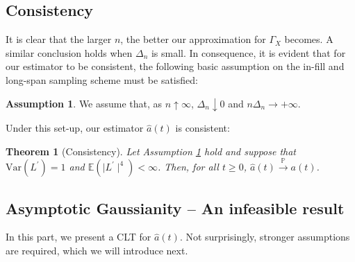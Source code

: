 \documentclass{article}
\theoremstyle{plain}
\newtheorem{theorem}{Theorem}
\theoremstyle{definition}
\newtheorem{assumption}{Assumption}
\theoremstyle{remark}
\newcommand{\Var}{\ensuremath{\mathrm{Var}}}
\begin{document}
\subsection{Consistency}
It is clear that the larger $n$, the better our approximation for $\varGamma_{X}$ becomes. A similar conclusion holds when $\Delta_{n}$ is small. In consequence, it is evident that for our estimator to be consistent, the following basic assumption on the in-fill and long-span sampling scheme must be satisfied:

\begin{assumption}\label{as:basicsamplingscheme} We assume that, as $n\uparrow\infty$,
	$\Delta_{n}\downarrow0$ and $n\Delta_{n}\rightarrow+\infty.$ 
\end{assumption}
Under this set-up, our estimator $\hat a(t)$ is consistent:
\begin{theorem}[Consistency]\label{propconsistency}
	Let Assumption \ref{as:basicsamplingscheme} hold and suppose that $\Var(L^{\prime})=1$ and $\mathbb{E}(\mid L^{\prime}\mid^{4})<\infty$.
	Then, for all $t\geq 0$, 
	$\hat a(t) \stackrel{\mathbb{P}}{\to} a(t)$.
\end{theorem}


\subsection{Asymptotic Gaussianity -- An infeasible result}
In this part, we present a CLT for $\hat a(t)$. Not surprisingly, stronger assumptions are required, which we will introduce next.
\end{document}
